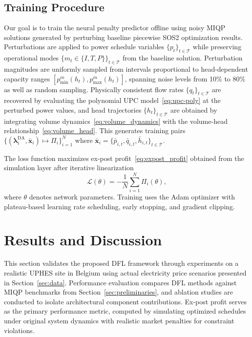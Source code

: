 \documentclass[journal]{IEEEtran}
\begin{document}
\subsection{Training Procedure}
\label{subsec:train_procedure}

Our goal is to train the neural penalty predictor offline using noisy MIQP solutions generated by perturbing baseline piecewise SOS2 optimization results. Perturbations are applied to power schedule variables $\{p_t\}_{t \in \mathcal{T}}$ while preserving operational modes $\{m_t \in \{I, T, P\}\}_{t \in \mathcal{T}}$ from the baseline solution. Perturbation magnitudes are uniformly sampled from intervals proportional to head-dependent capacity ranges $[p_{\min}^m(h_t), p_{\max}^m(h_t)]$, spanning noise levels from 10\% to 80\% as well as random sampling. Physically consistent flow rates $\{q_t\}_{t \in \mathcal{T}}$ are recovered by evaluating the polynomial UPC model~\eqref{eq:upc-poly} at the perturbed power values, and head trajectories $\{h_t\}_{t \in \mathcal{T}}$ are obtained by integrating volume dynamics~\eqref{eq:volume_dynamics} with the volume-head relationship~\eqref{eq:volume_head}. This generates training pairs $\{(\boldsymbol{\lambda}_i^{\text{DA}}, \bar{\mathbf{x}}_i) \mapsto \Pi_i\}_{i=1}^N$ where $\bar{\mathbf{x}}_i = \{\bar{p}_{i,t}, \bar{q}_{i,t}, \bar{h}_{i,t}\}_{t \in \mathcal{T}}$.

The loss function maximizes ex-post profit~\eqref{eq:expost_profit} obtained from the simulation layer after iterative linearization
\begin{equation}
\mathcal{L}(\theta) = -\frac{1}{N} \sum_{i=1}^N \Pi_i(\theta),
\label{eq:loss}
\end{equation}
where $\theta$ denotes network parameters. Training uses the Adam optimizer with plateau-based learning rate scheduling, early stopping, and gradient clipping.

\section{Results and Discussion}
\label{sec:results}

This section validates the proposed DFL framework through experiments on a realistic UPHES site in Belgium using actual electricity price scenarios presented in Section~\ref{sec:data}. Performance evaluation compares DFL methods against MIQP benchmarks from Section~\ref{sec:preliminaries}, and ablation studies are conducted to isolate architectural component contributions. Ex-post profit serves as the primary performance metric, computed by simulating optimized schedules under original system dynamics with realistic market penalties for constraint violations. 
\end{document}
